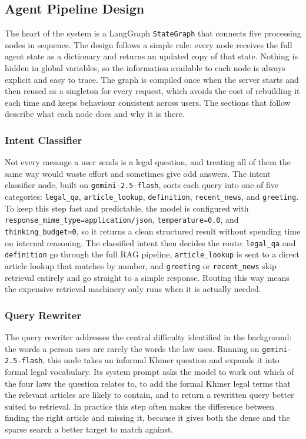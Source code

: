 \subsection{Agent Pipeline Design}

\hs The heart of the system is a LangGraph \texttt{StateGraph} that connects five
processing nodes in sequence. The design follows a simple rule: every node receives the
full agent state as a dictionary and returns an updated copy of that state. Nothing is
hidden in global variables, so the information available to each node is always explicit
and easy to trace. The graph is compiled once when the server starts and then reused as
a singleton for every request, which avoids the cost of rebuilding it each time and keeps
behaviour consistent across users. The sections that follow describe what each node does
and why it is there.

\subsubsection*{Intent Classifier}

\hs Not every message a user sends is a legal question, and treating all of them the same
way would waste effort and sometimes give odd answers. The intent classifier node, built
on \texttt{gemini-2.5-flash}, sorts each query into one of five categories:
\texttt{legal\_qa}, \texttt{article\_lookup}, \texttt{definition},
\texttt{recent\_news}, and \texttt{greeting}. To keep this step fast and predictable, the
model is configured with \texttt{response\_mime\_type=application/json},
\texttt{temperature=0.0}, and \texttt{thinking\_budget=0}, so it returns a clean
structured result without spending time on internal reasoning. The classified intent then
decides the route: \texttt{legal\_qa} and \texttt{definition} go through the full RAG
pipeline, \texttt{article\_lookup} is sent to a direct article lookup that matches by
number, and \texttt{greeting} or \texttt{recent\_news} skip retrieval entirely and go
straight to a simple response. Routing this way means the expensive retrieval machinery
only runs when it is actually needed.

\subsubsection*{Query Rewriter}

\hs The query rewriter addresses the central difficulty identified in the background: the
words a person uses are rarely the words the law uses. Running on
\texttt{gemini-2.5-flash}, this node takes an informal Khmer question and expands it into
formal legal vocabulary. Its system prompt asks the model to work out which of the four
laws the question relates to, to add the formal Khmer legal terms that the relevant
articles are likely to contain, and to return a rewritten query better suited to
retrieval. In practice this step often makes the difference between finding the right
article and missing it, because it gives both the dense and the sparse search a better
target to match against.

